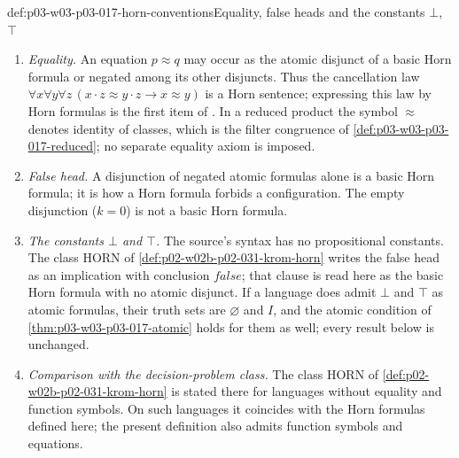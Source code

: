 \begin{hbconvention}{def:p03-w03-p03-017-horn-conventions}{Equality, false heads and the constants \(\bot\), \(\top\)}
\begin{enumerate}
  \item \emph{Equality.}  An equation \(p\approx q\) may occur as the
        atomic disjunct of a basic Horn formula or negated among its other
        disjuncts.  Thus the cancellation law
        \(\forall x\forall y\forall z\,(x\cdot z\approx y\cdot z\to x\approx
        y)\) is a Horn sentence; expressing this law by Horn formulas is
        the first item of
        \cite[V\S1, Exercise~29, p.~204]{BurrisSankappanavar2012}.  In a
        reduced product the symbol \(\approx\) denotes identity of classes,
        which is the filter congruence of
        \cref{def:p03-w03-p03-017-reduced}; no separate equality axiom is
        imposed.
  \item \emph{False head.}  A disjunction of negated atomic formulas alone
        is a basic Horn formula; it is how a Horn formula forbids a
        configuration.  The
        empty disjunction (\(k=0\)) is not a basic Horn formula.
  \item \emph{The constants \(\bot\) and \(\top\).}  The source's syntax has
        no propositional constants.  The class \(\mathrm{HORN}\) of
        \cref{def:p02-w02b-p02-031-krom-horn} writes the false head as an
        implication with conclusion \(\mathit{false}\); that clause is read
        here as the basic Horn formula with no atomic disjunct.  If a
        language does admit \(\bot\) and \(\top\) as atomic formulas, their
        truth sets are \(\varnothing\) and \(I\), and the atomic condition of
        \cref{thm:p03-w03-p03-017-atomic} holds for them as well; every
        result below is unchanged.
  \item \emph{Comparison with the decision-problem class.}  The class
        \(\mathrm{HORN}\) of \cref{def:p02-w02b-p02-031-krom-horn} is
        stated there for languages without equality and function symbols.
        On such languages it coincides with the Horn formulas defined here;
        the present definition also admits function symbols and equations.
\end{enumerate}
\end{hbconvention}

